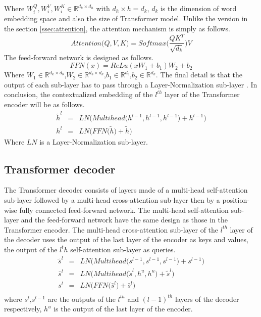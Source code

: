 Where $W_i^Q, W_i^V, W_i^K \in \mathbb{R}^{d_k \times d_h}$ with $d_h \times h = d_k$, $d_k$ is the dimension of word embedding space and also the size of Transformer model. Unlike the version in the section \ref{ssec:attention}, the attention mechanism is simply as follows.
\begin{equation}
Attention\big( Q, V, K \big) = Softmax\big(\frac{Q K^T}{\sqrt{d_k}} \big) V
\end{equation}
The feed-forward network is designed as follows.
\begin{equation}
FFN(x) = ReLu(xW_1+b_1)W_2+b_2
\end{equation}
Where $W_1 \in \mathbb{R}^{d_k \times d_b}$,$W_2 \in \mathbb{R}^{d_b \times d_k}$,$b_1 \in \mathbb{R}^{d_b}$,$b_2 \in \mathbb{R}^{d_k}$.
The final detail is that the output of each sub-layer has to pass through a Layer-Normalization sub-layer \citep{Jimmy16layer}. In conclusion, the contextualized embedding of the $l^{th}$ layer of the Transformer encoder will be as follows.
\begin{equation}
\begin{array}{rcl}
\tilde{h}^l &=& LN\bigg(Multihead\big(h^{l-1}, h^{l-1}, h^{l-1}\big) + h^{l-1}\bigg) \\ 
h^l &=& LN\bigg(FFN\big(\tilde{h}\big) + \tilde{h}\bigg)
\end{array}
\end{equation}
Where $LN$ is a Layer-Normalization sub-layer.
\subsection{Transformer decoder}
The Transformer decoder consists of layers made of a multi-head self-attention sub-layer followed by a multi-head cross-attention sub-layer then by a position-wise fully connected feed-forward network. The multi-head self-attention sub-layer and the feed-forward network have the same design as those in the Transformer encoder. The multi-head cross-attention sub-layer of the $l^{th}$ layer of the decoder uses the output of the last layer of the encoder as keys and values, the output of the $l^th$ self-attention sub-layer as queries.
\begin{equation}
\begin{array}{rcl}
\tilde{s}^l &=& LN\bigg( Multihead\big( s^{l-1},s^{l-1},s^{l-1} \big) + s^{l-1} \bigg) \\
\bar{s}^l &=& LN\bigg( Multihead\big( \tilde{s}^l, h^u, h^u \big) + \tilde{s}^l \bigg) \\
s^l &=& LN\bigg( FFN\big( \bar{s}^l \big) + \bar{s}^l \bigg) \\
\end{array}
\end{equation}
where $s^l$,$s^{l-1}$ are the outputs of the $l^{th}$ and $(l-1)^{th}$ layers of the decoder respectively, $h^u$ is the output of the last layer of the encoder.

